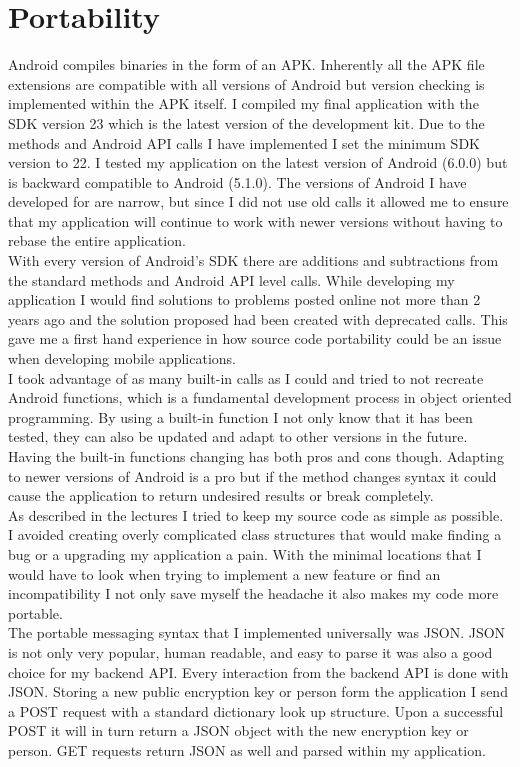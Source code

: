 \documentclass[letterpaper,12pt,notitlepage,fleqn]{article}
\begin{document}
\section{Portability}
\indent Android compiles binaries in the form of an APK. Inherently all the APK file extensions are compatible with all versions of Android but version checking is implemented within the APK itself. I compiled my final application with the SDK version 23 which is the latest version of the development kit. Due to the methods and Android API calls I have implemented I set the minimum SDK version to 22. I tested my application on the latest version of Android (6.0.0) but is backward
compatible to Android (5.1.0). The versions of Android I have developed for are narrow, but since I did not use old calls it allowed me to ensure that my application will continue to work with newer versions without having to rebase the entire application. 
\\
\indent With every version of Android's SDK there are additions and subtractions from the standard methods and Android API level calls. While developing my application I would find solutions to problems posted online not more than 2 years ago and the solution proposed had been created with deprecated calls. This gave me a first hand experience in how source code portability could be an issue when developing mobile applications. 
\\
\indent I took advantage of as many built-in calls as I could and tried to not recreate Android functions, which is a fundamental development process in object oriented programming. By using a built-in function I not only know that it has been tested, they can also be updated and adapt to other versions in the future. Having the built-in functions changing has both pros and cons though. Adapting to newer versions of Android is a pro but if the method changes syntax it could cause the
application to return undesired results or break completely. 
\\
\indent As described in the lectures I tried to keep my source code as simple as possible. I avoided creating overly complicated class structures that would make finding a bug or a upgrading my application a pain. With the minimal locations that I would have to look when trying to implement a new feature or find an incompatibility I not only save myself the headache it also makes my code more portable. 
\\
\indent The portable messaging syntax that I implemented universally was JSON. JSON is not only very popular, human readable, and easy to parse it was also a good choice for my backend API. Every interaction from the backend API is done with JSON. Storing a new public encryption key or person form the application I send a POST request with a standard dictionary look up structure. Upon a successful POST it will in turn return a JSON object with the new encryption key or person. GET requests return JSON as
well and parsed within my application. 
\end{document}
